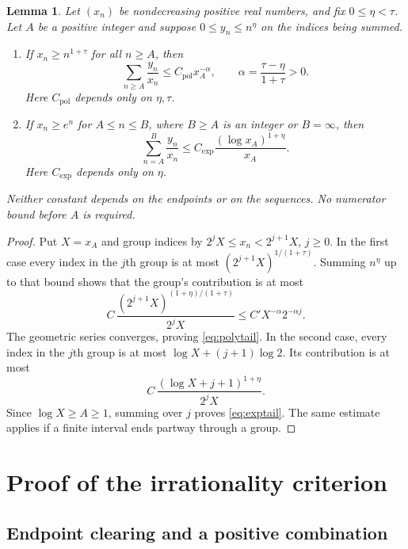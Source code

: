 \documentclass[11pt]{article}
\newtheorem{lemma}[theorem]{Lemma}
\numberwithin{equation}{section}
\begin{document}
\begin{lemma}\label{lem:tails}
Let $(x_n)$ be nondecreasing positive real numbers, and fix
$0\le\eta<\tau$. Let $A$ be a positive integer and suppose
$0\le y_n\le n^\eta$ on the indices being summed.
\begin{enumerate}
\item If $x_n\ge n^{1+\tau}$ for all $n\ge A$, then
\begin{equation}\label{eq:polytail}
  \sum_{n\ge A}\frac{y_n}{x_n}
  \le C_{\mathrm{pol}}x_A^{-\alpha},
  \qquad \alpha=\frac{\tau-\eta}{1+\tau}>0.
\end{equation}
Here $C_{\mathrm{pol}}$ depends only on $\eta,\tau$.
\item If $x_n\ge e^n$ for $A\le n\le B$, where $B\ge A$ is an integer
or $B=\infty$, then
\begin{equation}\label{eq:exptail}
  \sum_{n=A}^{B}\frac{y_n}{x_n}
  \le C_{\mathrm{exp}}\frac{(\log x_A)^{1+\eta}}{x_A}.
\end{equation}
Here $C_{\mathrm{exp}}$ depends only on $\eta$.
\end{enumerate}
Neither constant depends on the endpoints or on the sequences. No
numerator bound before $A$ is required.
\end{lemma}

\begin{proof}
Put $X=x_A$ and group indices by $2^jX\le x_n<2^{j+1}X$, $j\ge0$.
In the first case every index in the $j$th group is at most
$(2^{j+1}X)^{1/(1+\tau)}$. Summing $n^\eta$ up to that bound shows
that the group's contribution is at most
\[
  C\,\frac{(2^{j+1}X)^{(1+\eta)/(1+\tau)}}{2^jX}
  \le C'X^{-\alpha}2^{-\alpha j}.
\]
The geometric series converges, proving \eqref{eq:polytail}.
In the second case, every index in the $j$th group is at most
$\log X+(j+1)\log2$. Its contribution is at most
\[
  C\,\frac{(\log X+j+1)^{1+\eta}}{2^jX}.
\]
Since $\log X\ge A\ge1$, summing over $j$ proves
\eqref{eq:exptail}. The same estimate applies if a finite interval
ends partway through a group.
\end{proof}

\section{Proof of the irrationality criterion}\label{sec:proof}

\subsection{Endpoint clearing and a positive combination}
\end{document}
